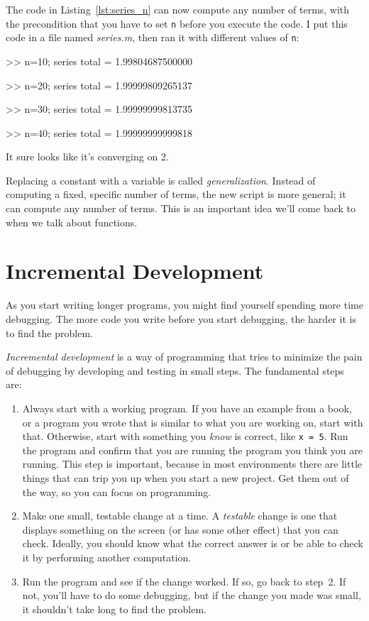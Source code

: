 The code in Listing~\ref{lst:series_n} can now compute any number of terms, with the
precondition that you have to set \lstinline{n} before you execute
the code.
I put this code in a file named \emph{series.m}, then
ran it with different values of \lstinline{n}:

\begin{code}
>> n=10; series
total = 1.99804687500000

>> n=20; series
total = 1.99999809265137

>> n=30; series
total = 1.99999999813735

>> n=40; series
total = 1.99999999999818
\end{code}

It sure looks like it's converging on 2.

Replacing a constant with a variable is called \emph{generalization}.
Instead of computing a fixed, specific number of terms, the new script
is more general; it can compute any number of terms.
This is an important idea we'll come back to when we talk about functions.

\section{Incremental Development}


As you start writing longer programs, you might find yourself spending more time debugging.
The more code you write before you start debugging, the harder it is to find
the problem.

\emph{Incremental development} is a way of programming that tries
to minimize the pain of debugging by developing and testing in small steps.  The fundamental steps are:

\begin{enumerate}

\item Always start with a working program.  If you have an
example from a book, or a program you wrote that is similar to
what you are working on, start with that.  Otherwise, start with
something you \emph{know}  is correct, like \lstinline{x = 5}.  Run the program
and confirm that you are running the program you think you are
running.
This step is important, because in most environments there
are little things that can trip you up when you start a new
project.  Get them out of the way, so you can focus on programming.

\item Make one small, testable change at a time.  A \emph{testable}
change is one that displays something on the screen (or has some
other effect) that you can check.  Ideally, you should know what
the correct answer is or be able to check it by performing another
computation.

\item Run the program and see if the change worked.  If so, go back
to step~2.  If not, you'll have to do some debugging, but if the
change you made was small, it shouldn't take long to find the problem.

\end{enumerate}

